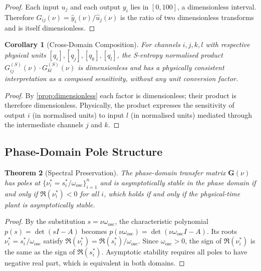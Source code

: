 \documentclass[10pt,twocolumn]{article}
\theoremstyle{plain}
\newtheorem{theorem}{Theorem}[section]
\newtheorem{corollary}[theorem]{Corollary}
\theoremstyle{definition}
\theoremstyle{remark}
\newcommand{\omegaosc}{\omega_{\mathrm{osc}}}
\begin{document}
\begin{proof}
Each input $u_j$ and each output $y_i$ lies in $[0,100]$, a
dimensionless interval.  Therefore $G_{ij}(\nu) = \hat{y}_i(\nu)/\hat{u}_j(\nu)$
is the ratio of two dimensionless transforms and is itself
dimensionless.
\end{proof}

\begin{corollary}[Cross-Domain Composition]
\label{cor:crossdomain}
For channels $i,j,k,l$ with respective physical units $[q_i],[q_j],
[q_k],[q_l]$, the S-entropy normalised product
$G_{ij}^{(S)}(\nu)\cdot G_{kl}^{(S)}(\nu)$ is dimensionless and has a
physically consistent interpretation as a composed sensitivity, without
any unit conversion factor.
\end{corollary}

\begin{proof}
By \cref{prop:dimensionless} each factor is dimensionless; their product
is therefore dimensionless.  Physically, the product expresses the
sensitivity of output $i$ (in normalised units) to input $l$ (in
normalised units) mediated through the intermediate channels $j$ and
$k$.
\end{proof}

\subsection{Phase-Domain Pole Structure}
\label{ssec:poles}

\begin{theorem}[Spectral Preservation]
\label{thm:spectral}
The phase-domain transfer matrix $\mathbf{G}(\nu)$ has poles at
$\{\nu_i^* = s_i^*/\omegaosc\}_{i=1}^n$ and is asymptotically stable
in the phase domain if and only if $\Re(\nu_i^*) < 0$ for all $i$,
which holds if and only if the physical-time plant is asymptotically
stable.
\end{theorem}

\begin{proof}
By the substitution $s = \nu\omegaosc$, the characteristic polynomial
$p(s) = \det(sI - A)$ becomes $p(\nu\omegaosc)
= \det(\nu\omegaosc I - A)$.  Its roots $\nu_i^* = s_i^*/\omegaosc$
satisfy $\Re(\nu_i^*) = \Re(s_i^*)/\omegaosc$.  Since $\omegaosc > 0$,
the sign of $\Re(\nu_i^*)$ is the same as the sign of $\Re(s_i^*)$.
Asymptotic stability requires all poles to have negative real part,
which is equivalent in both domains.
\end{proof}
\end{document}
